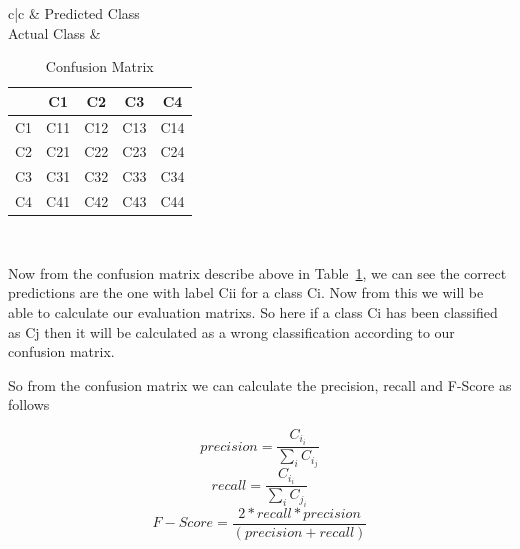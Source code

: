 \documentclass[sigconf]{acmart}
\theoremstyle{break}
\begin{document}
    \begin{table}[h!]
        \centering
        \begin{tabular}{c|c}
            & Predicted Class \\
            \hline
            Actual Class & \begin{tabular}{c|c|c|c|c}
                & C1  & C2  & C3  & C4  \\
                \hline
                C1 & C11 & C12 & C13 & C14 \\
                \hline
                C2 & C21 & C22 & C23 & C24 \\
                \hline
                C3 & C31 & C32 & C33 & C34 \\
                \hline
                C4 & C41 & C42 & C43 & C44 \\
            \end{tabular} \\
            \hline
        \end{tabular}
        \caption{Confusion Matrix}
        \label{tab:confusion_matrix}
    \end{table}
    
    Now from the confusion matrix describe above in Table~\ref{tab:confusion_matrix}, we can see the correct predictions are the one with label Cii for a class Ci. Now from this we will be able to calculate our evaluation matrixs. So here if a class Ci has been classified as Cj then it will be calculated as a wrong classification according to our confusion matrix.
    
    So from the confusion matrix we can calculate the precision, recall and F-Score as follows
    
    \begin{equation}
        precision = \frac{C_i_i}{\sum\limits_{i}C_i_j}
    \end{equation}
        \begin{equation}
        recall = \frac{C_i_i}{\sum\limits_{i}C_j_i}
    \end{equation}
        \begin{equation}
        F-Score = \frac{2*recall*precision}{(precision + recall)}
    \end{equation}
\end{document}

